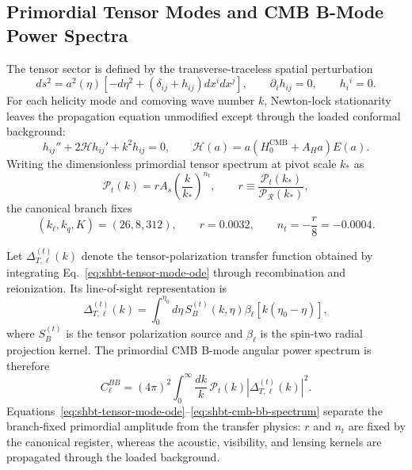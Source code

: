 \documentclass[11pt,letterpaper]{article}
\theoremstyle{plain}
\newcommand{\kell}{k_{\ell}}
\newcommand{\kq}{k_q}
\newcommand{\Kpar}{K}
\newcommand{\hcmb}{H_0^{\text{CMB}}}
\newcommand{\AH}{A_H}
\begin{document}
\subsection{Primordial Tensor Modes and CMB B-Mode Power Spectra}
\label{sec:primordial-tensor-b-modes}

The tensor sector is defined by the transverse-traceless spatial perturbation
\begin{equation}
\label{eq:shbt-tensor-metric}
 ds^2
 =
 a^2(\eta)
 \left[
 -d\eta^2+
 \left(\delta_{ij}+h_{ij}\right)dx^i dx^j
 \right],
 \qquad
 \partial_i h_{ij}=0,
 \qquad
 h_i{}^i=0.
\end{equation}
For each helicity mode and comoving wave number \(k\), Newton-lock
stationarity leaves the propagation equation unmodified except through the
loaded conformal background:
\begin{equation}
\label{eq:shbt-tensor-mode-ode}
 \boxed{
 h_{ij}''+2\mathcal H h_{ij}'+k^2h_{ij}=0,
 \qquad
 \mathcal H(a)
 =
 a\left(\hcmb+\AH a\right)E(a).}
\end{equation}
Writing the dimensionless primordial tensor spectrum at pivot scale \(k_*\) as
\begin{equation}
\label{eq:shbt-primordial-tensor-spectrum}
 \mathcal P_t(k)
 =
 rA_s
 \left(\frac{k}{k_*}\right)^{n_t},
 \qquad
 r
 \equiv
 \frac{\mathcal P_t(k_*)}{\mathcal P_{\mathcal R}(k_*)},
\end{equation}
the canonical branch fixes
\begin{equation}
\label{eq:shbt-canonical-tensor-values}
 (\kell,\kq,\Kpar)=(26,8,312),
 \qquad
 r=0.0032,
 \qquad
 n_t=-\frac{r}{8}=-0.0004.
\end{equation}

Let \(\Delta_{T,\ell}^{(t)}(k)\) denote the tensor-polarization transfer
function obtained by integrating Eq.~\eqref{eq:shbt-tensor-mode-ode} through
recombination and reionization.  Its line-of-sight representation is
\begin{equation}
\label{eq:shbt-tensor-transfer-function}
 \Delta_{T,\ell}^{(t)}(k)
 =
 \int_0^{\eta_0}
 d\eta\,
 S_B^{(t)}(k,\eta)
 \beta_\ell\!\left[k(\eta_0-\eta)\right],
\end{equation}
where \(S_B^{(t)}\) is the tensor polarization source and
\(\beta_\ell\) is the spin-two radial projection kernel.  The primordial
CMB B-mode angular power spectrum is therefore
\begin{equation}
\label{eq:shbt-cmb-bb-spectrum}
 \boxed{
 C_\ell^{BB}
 =
 (4\pi)^2
 \int_0^\infty
 \frac{dk}{k}\,
 \mathcal P_t(k)
 \left|
 \Delta_{T,\ell}^{(t)}(k)
 \right|^2.}
\end{equation}
Equations~\eqref{eq:shbt-tensor-mode-ode}--\eqref{eq:shbt-cmb-bb-spectrum}
separate the branch-fixed primordial amplitude from the transfer physics:
\(r\) and \(n_t\) are fixed by the canonical register, whereas the acoustic,
visibility, and lensing kernels are propagated through the loaded background.
\end{document}
